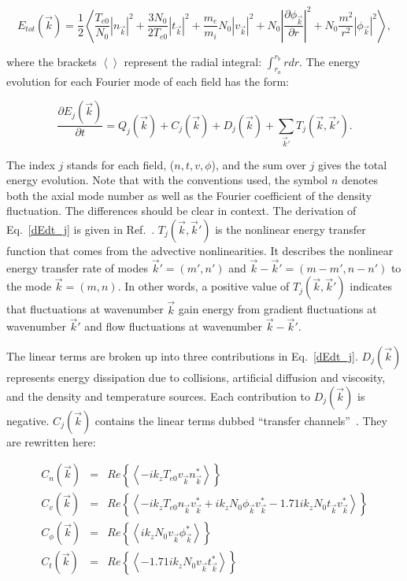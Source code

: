 \documentclass[showpacs,preprintnumbers,amsmath,amssymb,superscriptaddress,aip]{revtex4-1}
\def\beq{\begin{equation}}
\def\eeq{\end{equation}}
\def\beqar{\begin{eqnarray}}
\def\eeqar{\end{eqnarray}}
\newcommand{\pdiff}[2]{\frac{\partial#1}{\partial#2}}
\begin{document}
\beq
\label{E_k}
E_{tot}(\vec{k}) = \frac{1}{2} \left< \frac{T_{e0}}{N_0} |n_{\vec{k}}|^2 + \frac{3 N_0}{2 T_{e0}} |t_{\vec{k}}|^2 + \frac{m_e}{m_i} N_0 |v_{\vec{k}}|^2 + N_0 \left| \pdiff{\phi_{\vec{k}}}{r} \right|^2 + N_0 \frac{m^2}{r^2} |\phi_{\vec{k}}|^2 \right>,
\eeq

where the brackets $\left< \right>$ represent the radial integral: $\int_{r_a}^{r_b} r dr$. 
The energy evolution for each Fourier mode of each field has the form:

\beq
\label{dEdt_j}
\pdiff{E_{j}(\vec{k})}{t} = Q_{j}(\vec{k}) + C_{j}(\vec{k}) + D_j(\vec{k}) + \sum_{\vec{k}'} T_{j}(\vec{k},\vec{k}').
\eeq

The index $j$ stands for each field, ($n,t,v,\phi$), and the sum over $j$ gives the total energy evolution. 
Note that with the conventions used, the symbol $n$ denotes both the axial mode number as
well as the Fourier coefficient of the density fluctuation. The differences should be clear in context. The derivation of Eq.~\ref{dEdt_j} 
is given in Ref.~\cite{friedman2012b}. $T_{j}(\vec{k},\vec{k}')$ is the nonlinear energy transfer function that comes from the advective
nonlinearities.  It describes the nonlinear energy transfer rate of modes $\vec{k}'=(m',n')$ and $\vec{k}-\vec{k}'=(m-m',n-n')$ to the mode $\vec{k}=(m,n)$. 
In other words, a positive value of $T_{j}(\vec{k},\vec{k}')$ indicates that fluctuations
at wavenumber $\vec{k}$ gain energy from gradient fluctuations at wavenumber $\vec{k}'$ and flow fluctuations at wavenumber $\vec{k}-\vec{k}'$.

The linear terms are broken up into three contributions in Eq.~\ref{dEdt_j}.
$D_{j}(\vec{k})$ represents energy dissipation due to collisions, artificial diffusion and viscosity, and the density and temperature sources.
Each contribution to $D_j(\vec{k})$ is negative. 
$C_j(\vec{k})$ contains the linear terms dubbed ``transfer channels''~\cite{scott2002}. They are rewritten here:

\beqar
C_n(\vec{k}) & = & Re \left\{ \left< - i k_z T_{e0} v_{\vec{k}} n_{\vec{k}}^* \right> \right\}
\label{Cnk} \\
C_v(\vec{k}) & = & Re \left\{ \left< - i k_z T_{e0} n_{\vec{k}} v_{\vec{k}}^* + i k_z N_0 \phi_{\vec{k}} v_{\vec{k}}^*  - 1.71 i k_z N_0 t_{\vec{k}} v_{\vec{k}}^*  \right> \right\}
\label{Cvk} \\
C_\phi(\vec{k}) & = & Re \left\{ \left< i k_z N_0 v_{\vec{k}} \phi_{\vec{k}}^* \right> \right\}
\label{Cpk} \\
C_t(\vec{k}) & = & Re \left\{ \left< - 1.71 i k_z N_0 v_{\vec{k}} t_{\vec{k}}^* \right> \right\}
\label{Ctk}
\eeqar
\end{document}
